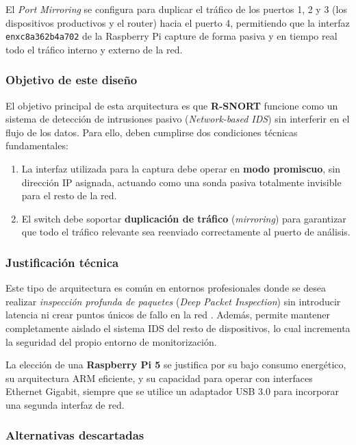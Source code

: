 \documentclass[11pt,a4paper,twoside]{report}
\begin{document}
El \textit{Port Mirroring} se configura para duplicar el tráfico de los puertos 1, 2 y 3 (los dispositivos productivos y el router) hacia el puerto 4, permitiendo que la interfaz \texttt{enxc8a362b4a702} de la Raspberry Pi capture de forma pasiva y en tiempo real todo el tráfico interno y externo de la red.

\subsubsection{Objetivo de este diseño}

El objetivo principal de esta arquitectura es que \textbf{R-SNORT} funcione como un sistema de detección de intrusiones pasivo (\textit{Network-based IDS}) sin interferir en el flujo de los datos. Para ello, deben cumplirse dos condiciones técnicas fundamentales:

\begin{enumerate}
	\item La interfaz utilizada para la captura debe operar en \textbf{modo promiscuo}, sin dirección IP asignada, actuando como una sonda pasiva totalmente invisible para el resto de la red.
	\item El switch debe soportar \textbf{duplicación de tráfico} (\textit{mirroring}) para garantizar que todo el tráfico relevante sea reenviado correctamente al puerto de análisis.
\end{enumerate}

\subsubsection{Justificación técnica}

Este tipo de arquitectura es común en entornos profesionales donde se desea realizar \textit{inspección profunda de paquetes} (\textit{Deep Packet Inspection}) sin introducir latencia ni crear puntos únicos de fallo en la red \cite{song2020dpi}. Además, permite mantener completamente aislado el sistema IDS del resto de dispositivos, lo cual incrementa la seguridad del propio entorno de monitorización.\newline

La elección de una \textbf{Raspberry Pi 5} se justifica por su bajo consumo energético, su arquitectura ARM eficiente, y su capacidad para operar con interfaces Ethernet Gigabit, siempre que se utilice un adaptador USB 3.0 para incorporar una segunda interfaz de red.

\subsubsection{Alternativas descartadas}
\end{document}
